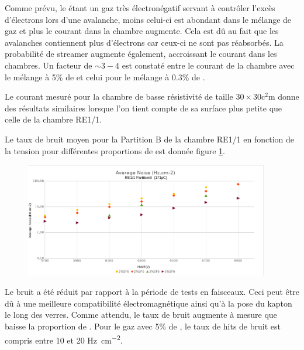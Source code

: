 Comme prévu, le  étant un gaz très électronégatif servant à contrôler l'excès d'électrons lors d'une avalanche, moins celui-ci est abondant dans le mélange de gaz et plus le courant dans la chambre augmente. Cela est dû au fait que les avalanches contiennent plus d'électrons car ceux-ci ne sont pas réabsorbés. La probabilité de streamer augmente également, accroissant le courant dans les chambres. Un facteur de $\sim 3-4$ est constaté entre le courant de la chambre avec le mélange à 5\% de  et celui pour le mélange à \num{0.3}\% de .

Le courant mesuré pour la chambre de basse résistivité de taille $\num{30}\times\num{30}\si{\square\centi\meter}$ donne des résultats similaires lorsque l'on tient compte de sa surface plus petite que celle de la chambre RE1/1.

Le taux de bruit moyen pour la Partition B de la chambre RE1/1 en fonction de la tension pour différentes proportions de  est donnée figure \ref{bruitB}.

 
 \begin{figure}[ht!]
 	\centering
 	\includegraphics[width=0.95\textwidth]{GLA/NoisvsSF6.png}
 	\label{bruitB}
 \end{figure}
 
 Le bruit a été réduit par rapport à la période de tests en faisceaux. Ceci peut être dû à une meilleure compatibilité électromagnétique ainsi qu'à la pose du kapton le long des verres. Comme attendu, le taux de bruit augmente à mesure que baisse la proportion de . Pour le gaz avec 5\% de , le taux de hits de bruit est compris entre \num{10} et \num{20} \si{\hertz\per\square\centi\meter}.
 
